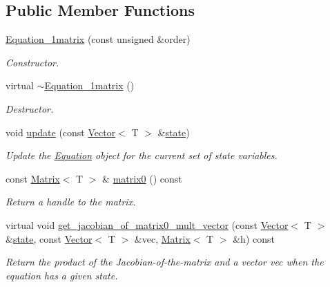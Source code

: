 \subsection*{Public Member Functions}
\begin{DoxyCompactItemize}
\item 
\hyperlink{classLuna_1_1Equation__1matrix_af76f7d2d3a138e8071390eb579fd2c4e}{Equation\+\_\+1matrix} (const unsigned \&order)
\begin{DoxyCompactList}\small\item\em Constructor. \end{DoxyCompactList}\item 
virtual \hyperlink{classLuna_1_1Equation__1matrix_a5f6241862fa31bb048be2e535df3eb94}{$\sim$\+Equation\+\_\+1matrix} ()
\begin{DoxyCompactList}\small\item\em Destructor. \end{DoxyCompactList}\item 
void \hyperlink{classLuna_1_1Equation__1matrix_a08f510d89ae39ed46752cddea5376ae8}{update} (const \hyperlink{classLuna_1_1Vector}{Vector}$<$ T $>$ \&\hyperlink{classLuna_1_1Residual_a41d9f863aa529f16c5d78fb19b4906bd}{state})
\begin{DoxyCompactList}\small\item\em Update the \hyperlink{classLuna_1_1Equation}{Equation} object for the current set of state variables. \end{DoxyCompactList}\item 
const \hyperlink{classLuna_1_1Matrix}{Matrix}$<$ T $>$ \& \hyperlink{classLuna_1_1Equation__1matrix_a7e0adf303491e67602d5e34ab7ec3ada}{matrix0} () const
\begin{DoxyCompactList}\small\item\em Return a handle to the matrix. \end{DoxyCompactList}\item 
virtual void \hyperlink{classLuna_1_1Equation__1matrix_ad2ddee223f6c9dfd0c95a867699bbd24}{get\+\_\+jacobian\+\_\+of\+\_\+matrix0\+\_\+mult\+\_\+vector} (const \hyperlink{classLuna_1_1Vector}{Vector}$<$ T $>$ \&\hyperlink{classLuna_1_1Residual_a41d9f863aa529f16c5d78fb19b4906bd}{state}, const \hyperlink{classLuna_1_1Vector}{Vector}$<$ T $>$ \&vec, \hyperlink{classLuna_1_1Matrix}{Matrix}$<$ T $>$ \&h) const
\begin{DoxyCompactList}\small\item\em Return the product of the Jacobian-\/of-\/the-\/matrix and a vector \textquotesingle{}vec\textquotesingle{} when the equation has a given \textquotesingle{}state\textquotesingle{}. \end{DoxyCompactList}\end{DoxyCompactItemize}

